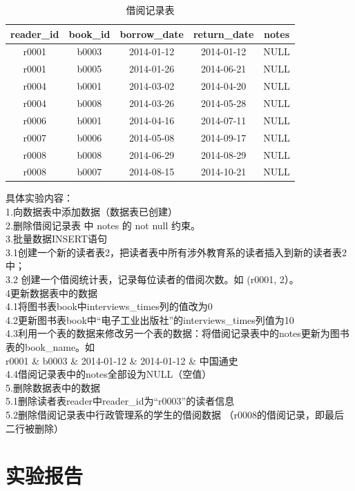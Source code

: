 \documentclass[a4paper]{article}
\begin{document}
\begin{table}[H]
\centering
\caption{借阅记录表}
\label{tab:record}
\begin{tabular}{|c|c|c|c|c|}
\hline
\textbf{reader\_id} & \textbf{book\_id} & \textbf{borrow\_date} & \textbf{return\_date} & \textbf{notes} \\
\hline
r0001 & b0003 & 2014-01-12 & 2014-01-12 & NULL \\
\hline
r0001 & b0005 & 2014-01-26 & 2014-06-21 & NULL \\
\hline
r0004 & b0001 & 2014-03-02 & 2014-04-20 & NULL \\
\hline
r0004 & b0008 & 2014-03-26 & 2014-05-28 & NULL \\
\hline
r0006 & b0001 & 2014-04-16 & 2014-07-11 & NULL \\
\hline
r0007 & b0006 & 2014-05-08 & 2014-09-17 & NULL \\
\hline
r0008 & b0008 & 2014-06-29 & 2014-08-29 & NULL \\
\hline
r0008 & b0007 & 2014-08-15 & 2014-10-21 & NULL \\
\hline
\end{tabular}
\end{table}
具体实验内容：\\
1.向数据表中添加数据（数据表已创建）\\
2.删除借阅记录表 中 notes 的 not null 约束。\\
3.批量数据INSERT语句\\
3.1创建一个新的读者表2，把读者表中所有涉外教育系的读者插入到新的读者表2中；\\
3.2 创建一个借阅统计表，记录每位读者的借阅次数。如 (r0001, 2）。\\
4更新数据表中的数据\\
4.1将图书表book中interviews\_times列的值改为0\\
4.2更新图书表book中“电子工业出版社”的interviews\_times列值为10\\
4.3利用一个表的数据来修改另一个表的数据：将借阅记录表中的notes更新为图书表的book\_name。如\\
r0001 \& b0003 \& 2014-01-12 \& 2014-01-12 \& 中国通史\\
4.4借阅记录表中的notes全部设为NULL（空值）\\
5.删除数据表中的数据\\
5.1删除读者表reader中reader\_id为“r0003”的读者信息\\
5.2删除借阅记录表中行政管理系的学生的借阅数据 （r0008的借阅记录，即最后二行被删除）
\section{实验报告}
\end{document}
